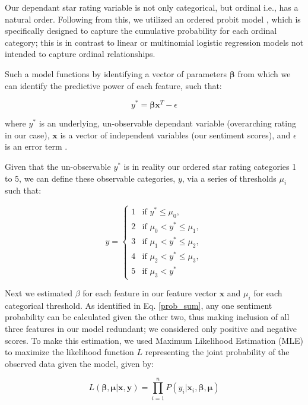 \documentclass[sn-mathphys,Numbered]{sn-jnl}%
\theoremstyle{thmstyleone}%
\theoremstyle{thmstyletwo}%
\theoremstyle{thmstylethree}%
\begin{document}
Our dependant star rating variable is not only categorical, but ordinal i.e., has a natural order. Following from this, we utilized an ordered probit model \cite{seabold2010statsmodels}, which is specifically designed to capture the cumulative probability for each ordinal category; this is in contrast to linear or multinomial logistic regression models not intended to capture ordinal relationships.

Such a model functions by identifying a vector of parameters $\boldsymbol{\beta}$ from which we can identify the predictive power of each feature, such that:

\begin{equation}
    y^* = \boldsymbol{\beta} \textbf{x}^T - \epsilon
\end{equation}

where $y^*$ is an underlying, un-observable dependant variable (overarching rating in our case), $\textbf{x}$ is a vector of independent variables (our sentiment scores), and $\epsilon$ is an error term \cite{greene2012econometric}.

Given that the un-observable $y^*$ is in reality our ordered star rating categories 1 to 5, we can define these observable categories, $y$, via a series of thresholds $\mu_i$ such that:

\begin{equation}
    y =
    \begin{cases}
        1 & \text{if }     y^* \leq \mu_0, \\
        2 & \text{if } \mu_0 < y^* \leq \mu_1, \\
        3 & \text{if } \mu_1 < y^* \leq \mu_2, \\
        4 & \text{if } \mu_2 < y^* \leq \mu_3, \\
        5 & \text{if } \mu_3 < y^*
    \end{cases}
\end{equation}

Next we estimated $\beta$ for each feature in our feature vector $\textbf{x}$ and $\mu_i$ for each categorical threshold. As identified in Eq. \ref{prob_sum}, any one sentiment probability can be calculated given the other two, thus making inclusion of all three features in our model redundant; we considered only positive and negative scores. To make this estimation, we used Maximum Likelihood Estimation (MLE) to maximize the likelihood function $L$ representing the joint probability of the observed data given the model, given by:

\begin{equation}
L(\boldsymbol{\beta}, \boldsymbol{\mu} | \textbf{x}, \textbf{y}) = \prod_{i=1}^n P(y_i | \textbf{x}_i, \boldsymbol{\beta}, \boldsymbol{\mu})
\end{equation}
\end{document}
